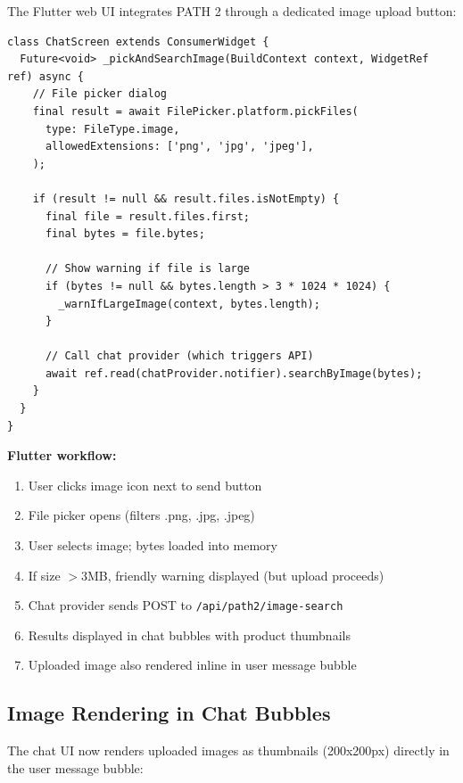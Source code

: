 The Flutter web UI integrates PATH 2 through a dedicated image upload button:

\begin{lstlisting}[caption={Flutter Image Search Integration --- chat\_screen.dart}]
class ChatScreen extends ConsumerWidget {
  Future<void> _pickAndSearchImage(BuildContext context, WidgetRef ref) async {
    // File picker dialog
    final result = await FilePicker.platform.pickFiles(
      type: FileType.image,
      allowedExtensions: ['png', 'jpg', 'jpeg'],
    );
    
    if (result != null && result.files.isNotEmpty) {
      final file = result.files.first;
      final bytes = file.bytes;
      
      // Show warning if file is large
      if (bytes != null && bytes.length > 3 * 1024 * 1024) {
        _warnIfLargeImage(context, bytes.length);
      }
      
      // Call chat provider (which triggers API)
      await ref.read(chatProvider.notifier).searchByImage(bytes);
    }
  }
}
\end{lstlisting}

\textbf{Flutter workflow:}
\begin{enumerate}
    \item User clicks image icon next to send button
    \item File picker opens (filters .png, .jpg, .jpeg)
    \item User selects image; bytes loaded into memory
    \item If size $>$3MB, friendly warning displayed (but upload proceeds)
    \item Chat provider sends POST to \texttt{/api/path2/image-search}
    \item Results displayed in chat bubbles with product thumbnails
    \item Uploaded image also rendered inline in user message bubble
\end{enumerate}

\subsection{Image Rendering in Chat Bubbles}

The chat UI now renders uploaded images as thumbnails (200x200px) directly in the user message bubble:

